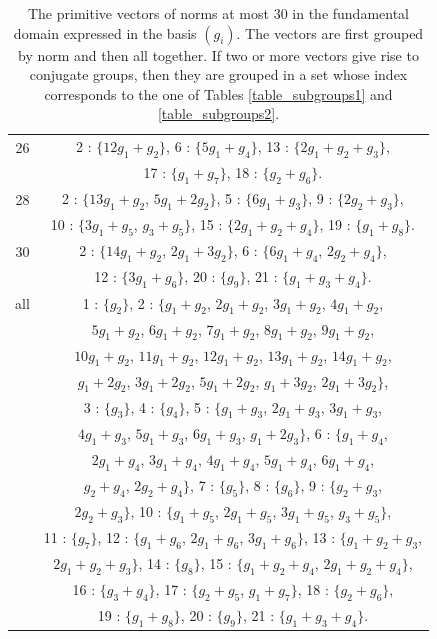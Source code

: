 \documentclass[a4paper,11pt]{article}
\begin{document}
\begin{table}
\begin{center}
\begin{tabular}{|c|c|}
\hline
26 & 2 : $\{12g_{1}+g_{2}\}$, 6 : $\{5g_{1}+g_{4}\}$, 13 : $\{2g_{1}+g_{2}+g_{3}\}$, \\
    & 17 : $\{g_{1}+g_{7}\}$, 18 : $\{g_{2}+g_{6}\}$.\\
\hline
28 & 2 : $\{13g_{1}+g_{2}$, $5g_{1}+2g_{2}\}$, 5 : $\{6g_{1}+g_{3}\}$, 9 : $\{2g_{2}+g_{3}\}$, \\
    & 10 : $\{3g_{1}+g_{5}$, $g_{3}+g_{5}\}$, 15 : $\{2g_{1}+g_{2}+g_{4}\}$, 19 : $\{g_{1}+g_{8}\}$.\\
\hline
30 & 2 : $\{14g_{1}+g_{2}$, $2g_{1}+3g_{2}\}$, 6 : $\{6g_{1}+g_{4}$, $2g_{2}+g_{4}\}$, \\
    & 12 : $\{3g_{1}+g_{6}\}$, 20 : $\{g_{9}\}$, 21 : $\{g_{1}+g_{3}+g_{4}\}$.\\
\hline
all & 1 : $\{g_{2}\}$, 2 : $\{g_{1}+g_{2}$, $2g_{1}+g_{2}$, $3g_{1}+g_{2}$, $4g_{1}+g_{2}$, \\
    & $5g_{1}+g_{2}$, $6g_{1}+g_{2}$, $7g_{1}+g_{2}$, $8g_{1}+g_{2}$, $9g_{1}+g_{2}$, \\
    & $10g_{1}+g_{2}$, $11g_{1}+g_{2}$, $12g_{1}+g_{2}$, $13g_{1}+g_{2}$, $14g_{1}+g_{2}$, \\
    & $g_{1}+2g_{2}$, $3g_{1}+2g_{2}$, $5g_{1}+2g_{2}$, $g_{1}+3g_{2}$, $2g_{1}+3g_{2}\}$, \\
    & 3 : $\{g_{3}\}$, 4 : $\{g_{4}\}$, 5 : $\{g_{1}+g_{3}$, $2g_{1}+g_{3}$, $3g_{1}+g_{3}$, \\
    & $4g_{1}+g_{3}$, $5g_{1}+g_{3}$, $6g_{1}+g_{3}$, $g_{1}+2g_{3}\}$, 6 : $\{g_{1}+g_{4}$, \\
    & $2g_{1}+g_{4}$, $3g_{1}+g_{4}$, $4g_{1}+g_{4}$, $5g_{1}+g_{4}$, $6g_{1}+g_{4}$, \\
    & $g_{2}+g_{4}$, $2g_{2}+g_{4}\}$, 7 : $\{g_{5}\}$, 8 : $\{g_{6}\}$, 9 : $\{g_{2}+g_{3}$, \\
    & $2g_{2}+g_{3}\}$, 10 : $\{g_{1}+g_{5}$, $2g_{1}+g_{5}$, $3g_{1}+g_{5}$, $g_{3}+g_{5}\}$, \\
    & 11 : $\{g_{7}\}$, 12 : $\{g_{1}+g_{6}$, $2g_{1}+g_{6}$, $3g_{1}+g_{6}\}$, 13 : $\{g_{1}+g_{2}+g_{3}$, \\
    & $2g_{1}+g_{2}+g_{3}\}$, 14 : $\{g_{8}\}$, 15 : $\{g_{1}+g_{2}+g_{4}$, $2g_{1}+g_{2}+g_{4}\}$, \\
    & 16 : $\{g_{3}+g_{4}\}$, 17 : $\{g_{2}+g_{5}$, $g_{1}+g_{7}\}$, 18 : $\{g_{2}+g_{6}\}$, \\
    & 19 : $\{g_{1}+g_{8}\}$, 20 : $\{g_{9}\}$, 21 : $\{g_{1}+g_{3}+g_{4}\}$.\\
\hline
\end{tabular}

\newpage

\caption{The primitive vectors of norms at most $30$ in the fundamental domain expressed in the basis $(g_i)$. The vectors are first grouped by norm and then all together. If two or more vectors give rise
to conjugate groups, then they are grouped in a set whose index corresponds to the one of Tables \ref{table_subgroups1} and  \ref{table_subgroups2}.}\label{ListVectorsNormAtMost30}

\end{center}
\end{table}
\end{document}
